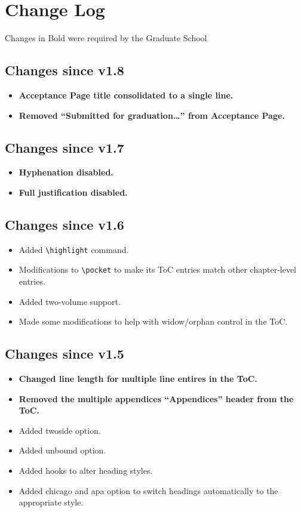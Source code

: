 \chapter{Change Log}
Changes in Bold were required by the Graduate School

\section{Changes since v1.8}
\begin{itemize}
\item{\textbf{Acceptance Page title consolidated to a single line.}}
\item{\textbf{Removed ``Submitted for graduation\ldots'' from Acceptance Page.}}
\end{itemize}

\section{Changes since v1.7}
\begin{itemize}
\item{\textbf{Hyphenation disabled.}}
\item{\textbf{Full justification disabled.}}
\end{itemize}

\section{Changes since v1.6}
\begin{itemize}
\item{Added \verb=\highlight= command.}
\item{Modifications to \verb=\pocket= to make its ToC entries match other chapter-level entries.}
\item{Added two-volume support.}
\item{Made some modifications to help with widow/orphan control in the ToC.}
\end{itemize}

\section{Changes since v1.5}
\begin{itemize}
\item{\textbf{Changed line length for multiple line entires in the ToC.}}
\item{\textbf{Removed the multiple appendices ``Appendices'' header from the ToC.}}
\item{Added twoside option.}
\item{Added unbound option.}
\item{Added hooks to alter heading styles.}
\item{Added chicago and apa option to switch headings automatically to the appropriate style.}
\end{itemize}

